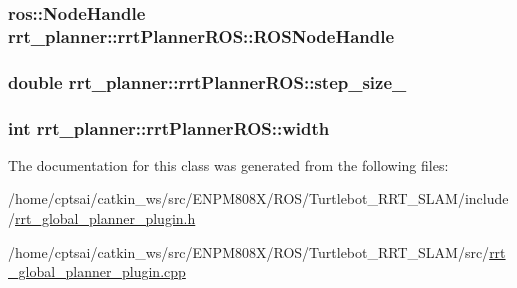 \subsubsection[{\texorpdfstring{R\+O\+S\+Node\+Handle}{ROSNodeHandle}}]{\setlength{\rightskip}{0pt plus 5cm}ros\+::\+Node\+Handle rrt\+\_\+planner\+::rrt\+Planner\+R\+O\+S\+::\+R\+O\+S\+Node\+Handle}\hypertarget{classrrt__planner_1_1rrtPlannerROS_ab0bceb51af7f6753d8ec3e5559b9bbb6}{}\label{classrrt__planner_1_1rrtPlannerROS_ab0bceb51af7f6753d8ec3e5559b9bbb6}
\subsubsection[{\texorpdfstring{step\+\_\+size\+\_\+}{step_size_}}]{\setlength{\rightskip}{0pt plus 5cm}double rrt\+\_\+planner\+::rrt\+Planner\+R\+O\+S\+::step\+\_\+size\+\_\+}\hypertarget{classrrt__planner_1_1rrtPlannerROS_adf70aa722bdc79c72ebdfee4ce7bdce3}{}\label{classrrt__planner_1_1rrtPlannerROS_adf70aa722bdc79c72ebdfee4ce7bdce3}
\subsubsection[{\texorpdfstring{width}{width}}]{\setlength{\rightskip}{0pt plus 5cm}int rrt\+\_\+planner\+::rrt\+Planner\+R\+O\+S\+::width}\hypertarget{classrrt__planner_1_1rrtPlannerROS_ae1f368fff6c8a74938f6283b22a035af}{}\label{classrrt__planner_1_1rrtPlannerROS_ae1f368fff6c8a74938f6283b22a035af}


The documentation for this class was generated from the following files\+:\begin{DoxyCompactItemize}
\item 
/home/cptsai/catkin\+\_\+ws/src/\+E\+N\+P\+M808\+X/\+R\+O\+S/\+Turtlebot\+\_\+\+R\+R\+T\+\_\+\+S\+L\+A\+M/include/\hyperlink{rrt__global__planner__plugin_8h}{rrt\+\_\+global\+\_\+planner\+\_\+plugin.\+h}\item 
/home/cptsai/catkin\+\_\+ws/src/\+E\+N\+P\+M808\+X/\+R\+O\+S/\+Turtlebot\+\_\+\+R\+R\+T\+\_\+\+S\+L\+A\+M/src/\hyperlink{rrt__global__planner__plugin_8cpp}{rrt\+\_\+global\+\_\+planner\+\_\+plugin.\+cpp}\end{DoxyCompactItemize}
